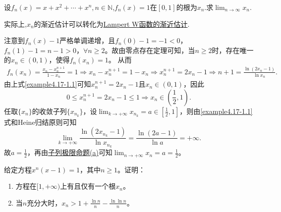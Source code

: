 \documentclass[../../main.tex]{subfiles}%
\begin{document}
\begin{example}
设\(f_n(x)=x + x^2+\cdots+x^n,n\in\mathbb{N}\),\(f_n(x)=1\)在\([0,1]\)的根为\(x_n\).求\(\lim_{n\rightarrow\infty}x_n\).
\end{example}
\begin{note}
实际上,$x_n$的渐近估计可以转化为\hyperref[proposition:Lampert W 函数的渐近估计]{Lampert W函数的渐近估计}.
\end{note}
\begin{solution}
注意到\(f_n(x) - 1\)严格单调递增，且\(f_n(0) - 1 = -1 < 0\)，\(f_n(1) - 1 = n - 1 > 0\)，\(\forall n\geqslant 2\)。故由零点存在定理可知，当\(n\geqslant 2\)时，存在唯一的\(x_n\in(0, 1)\)，使得\(f_n(x_n) = 1\)。
从而
\begin{align}\label{example4.17-1.1}
f_n(x_n)=\frac{x_n - x_{n}^{n + 1}}{1 - x_n}=1\Rightarrow x_n - x_{n}^{n + 1}=1 - x_n\Rightarrow x_{n}^{n + 1}=2x_n - 1\Rightarrow n + 1=\frac{\ln(2x_n - 1)}{\ln x_n}.  
\end{align}
由上式\eqref{example4.17-1.1}可知\(x_{n}^{n + 1}=2x_n - 1\)且\(x_n\in(0, 1)\)，因此
\[
0\leqslant x_{n}^{n + 1}=2x_n - 1\leqslant 1\Rightarrow x_n\in\left(\frac{1}{2}, 1\right).
\]
任取\(\{x_n\}\)的收敛子列\(\{x_{n_k}\}\)，设\(\lim_{k\rightarrow +\infty}x_{n_k}=a\in\left[\frac{1}{2}, 1\right]\)，则由\eqref{example4.17-1.1}式和Heine归结原则可知
\[
\lim_{k\rightarrow +\infty}\frac{\ln(2x_{n_k} - 1)}{\ln x_{n_k}}=\frac{\ln(2a - 1)}{\ln a}=+\infty.
\]
故\(a = \frac{1}{2}\)，再由\hyperref[proposition:子列极限命题]{子列极限命题(a)}可知\(\lim_{n\rightarrow +\infty}x_n=a=\frac{1}{2}\)。

\end{solution}

\begin{example}
给定方程$x^n(x-1)=1$，其中$n\geqslant 1$。证明：
\begin{enumerate}[(1)]
\item 方程在$[1,+\infty)$上有且仅有一个根$x_n$。
\item 当$n$充分大时，$x_n > 1+\frac{\ln n}{n}-\frac{\ln\ln n}{n}$。
\end{enumerate}
\end{example}
\end{document}
